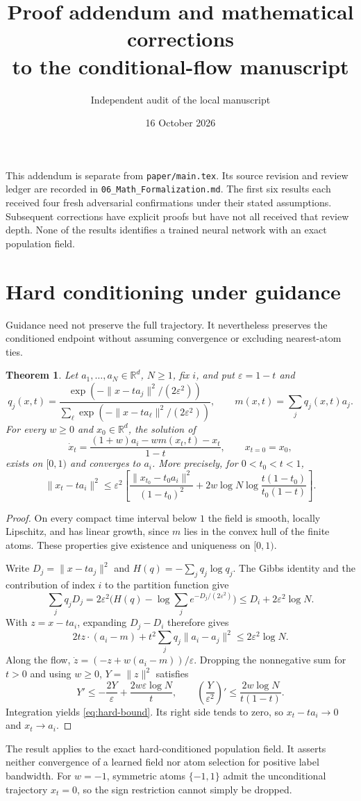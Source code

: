 \documentclass[11pt]{article}
\title{Proof addendum and mathematical corrections\\to the conditional-flow manuscript}
\author{Independent audit of the local manuscript}
\date{16 October 2026}
\newtheorem{theorem}{Theorem}
\newcommand{\R}{\mathbb R}
\newcommand{\eps}{\varepsilon}
\begin{document}
\maketitle
This addendum is separate from \texttt{paper/main.tex}. Its source revision and
review ledger are recorded in \texttt{06\_Math\_Formalization.md}. The first six
results each received four fresh adversarial confirmations under their stated
assumptions. Subsequent corrections have explicit proofs but have not all received
that review depth. None of the results identifies a trained neural network with
an exact population field.

\section{Hard conditioning under guidance}
Guidance need not preserve the full trajectory. It nevertheless preserves the
conditioned endpoint without assuming convergence or excluding nearest-atom ties.
\begin{theorem}\label{thm:hard}
Let $a_1,\ldots,a_N\in\R^d$, $N\ge1$, fix $i$, and put $\eps=1-t$ and
\[
q_j(x,t)=\frac{\exp(-\lVert x-ta_j\rVert^2/(2\eps^2))}
 {\sum_\ell\exp(-\lVert x-ta_\ell\rVert^2/(2\eps^2))},
\qquad m(x,t)=\sum_jq_j(x,t)a_j.
\]
For every $w\ge0$ and $x_0\in\R^d$, the solution of
\[
\dot x_t=\frac{(1+w)a_i-wm(x_t,t)-x_t}{1-t},\qquad x_{t=0}=x_0,
\]
exists on $[0,1)$ and converges to $a_i$. More precisely, for $0<t_0<t<1$,
\begin{equation}\label{eq:hard-bound}
\lVert x_t-ta_i\rVert^2\le\eps^2\left[
\frac{\lVert x_{t_0}-t_0a_i\rVert^2}{(1-t_0)^2}
+2w\log N\log\frac{t(1-t_0)}{t_0(1-t)}\right].
\end{equation}
\end{theorem}
\begin{proof}
On every compact time interval below $1$ the field is smooth, locally Lipschitz,
and has linear growth, since $m$ lies in the convex hull of the finite atoms.
These properties give existence and uniqueness on $[0,1)$.

Write $D_j=\lVert x-ta_j\rVert^2$ and $H(q)=-\sum_jq_j\log q_j$.
The Gibbs identity and the contribution of index $i$ to the partition function give
\[
\sum_jq_jD_j=2\eps^2\bigl(H(q)-\log\sum_je^{-D_j/(2\eps^2)}\bigr)
\le D_i+2\eps^2\log N.
\]
With $z=x-ta_i$, expanding $D_j-D_i$ therefore gives
\[
2t z\cdot(a_i-m)+t^2\sum_jq_j\lVert a_i-a_j\rVert^2
\le2\eps^2\log N.
\]
Along the flow, $\dot z=(-z+w(a_i-m))/\eps$. Dropping the nonnegative
sum for $t>0$ and using $w\ge0$, $Y=\lVert z\rVert^2$ satisfies
\[
Y'\le-\frac{2Y}{\eps}+\frac{2w\eps\log N}{t},\qquad
\left(\frac{Y}{\eps^2}\right)'\le\frac{2w\log N}{t(1-t)}.
\]
Integration yields \eqref{eq:hard-bound}. Its right side tends to zero, so
$x_t-ta_i\to0$ and $x_t\to a_i$.
\end{proof}
The result applies to the exact hard-conditioned population field. It asserts
neither convergence of a learned field nor atom selection for positive label
bandwidth. For $w=-1$, symmetric atoms $\{-1,1\}$ admit the unconditional
trajectory $x_t=0$, so the sign restriction cannot simply be dropped.
\end{document}
